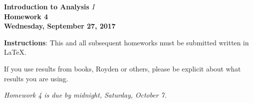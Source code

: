 \documentclass{article}%
\begin{document}
\begin{center}
\textbf{Introduction to Analysis $I$\\Homework 4\\Wednesday, September 27, 2017}\bigskip
\end{center}

\noindent\textbf{Instructions}: This and all subsequent homeworks must be submitted written in \LaTeX.

\noindent If you use results from books, Royden or others, please be explicit about what results you are using.



\begin{center}
\emph{Homework 4 is due by midnight, Saturday, October 7.}
\end{center} 
\medskip
\end{document}

